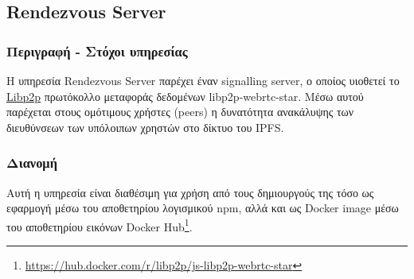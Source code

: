 \subsection{Rendezvous Server} \label{subsection:4-3-7-rendezvous-server-service}

\subsubsection{Περιγραφή - Στόχοι υπηρεσίας}

Η υπηρεσία Rendezvous Server παρέχει έναν signalling server, ο οποίος υιοθετεί το \hyperref[subsection:4-2-4-3-libp2p]{Libp2p} πρωτόκολλο μεταφοράς δεδομένων libp2p-webrtc-star. Μέσω αυτού παρέχεται στους ομότιμους χρήστες (peers) η δυνατότητα ανακάλυψης των διευθύνσεων των υπόλοιπων χρηστών στο δίκτυο του IPFS.

\subsubsection{Διανομή}

Αυτή η υπηρεσία είναι διαθέσιμη για χρήση από τους δημιουργούς της τόσο ως εφαρμογή μέσω του αποθετηρίου λογισμικού npm, αλλά και ως Docker image μέσω του αποθετηρίου εικόνων Docker Hub\footnote{\url{https://hub.docker.com/r/libp2p/js-libp2p-webrtc-star}}.
